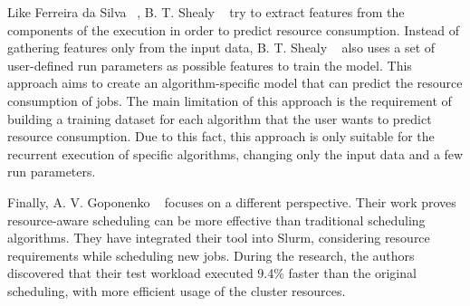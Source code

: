 Like Ferreira da Silva \etal~\cite{ferreira2013}, B. T. Shealy \etal~\cite{shealy2021} try to extract features from the components of the execution in order to predict resource consumption.
Instead of gathering features only from the input data, B. T. Shealy \etal~\cite{shealy2021} also uses a set of user-defined run parameters as possible features to train the model.
This approach aims to create an algorithm-specific model that can predict the resource consumption of jobs.
The main limitation of this approach is the requirement of building a training dataset for each algorithm that the user wants to predict resource consumption.
Due to this fact, this approach is only suitable for the recurrent execution of specific algorithms, changing only the input data and a few run parameters.

Finally, A. V. Goponenko \etal~\cite{goponenko2020} focuses on a different perspective.
Their work proves resource-aware scheduling can be more effective than traditional scheduling algorithms.
They have integrated their tool into Slurm, considering resource requirements while scheduling new jobs.
During the research, the authors discovered that their test workload executed 9.4\% faster than the original scheduling, with more efficient usage of the cluster resources.
